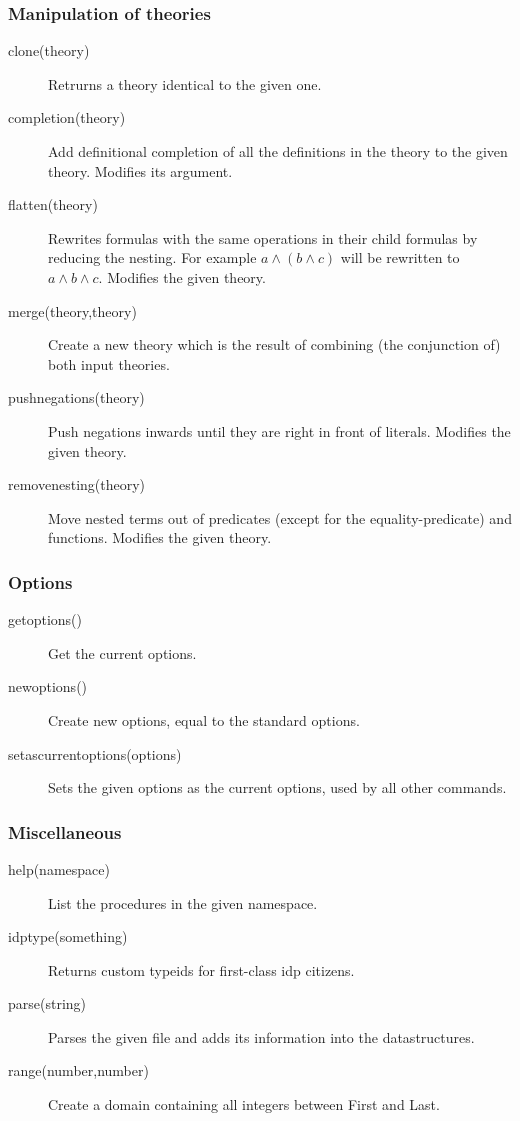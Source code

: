 \documentclass[a4]{article}
\begin{document}
\subsubsection{Manipulation of theories}
\begin{description}
	\item[clone(theory)]
		Retrurns a theory identical to the given one.
	\item[completion(theory)]
		Add definitional completion of all the definitions in the theory to the given theory. Modifies its argument.
	\item[flatten(theory)]
		Rewrites formulas with the same operations in their child formulas by reducing the nesting. For example $a \wedge (b\wedge c)$ will be rewritten to $a\wedge b \wedge c$.
		Modifies the given theory. 
	\item[merge(theory,theory)]
 		Create a new theory which is the result of combining (the conjunction of) both input theories.
	\item[pushnegations(theory)]
 		Push negations inwards until they are right in front of literals.
 		Modifies the given theory.
	\item[removenesting(theory)]
 		Move nested terms out of predicates (except for the equality-predicate) and functions.
 		Modifies the given theory.
\end{description}

\subsubsection{Options}
\begin{description}
	\item[getoptions()]
 		Get the current options.
	\item[newoptions()]
 		Create new options, equal to the standard options.
	\item[setascurrentoptions(options)]
 		Sets the given options as the current options, used by all other commands.
\end{description}

\subsubsection{Miscellaneous}
\begin{description}
	\item[help(namespace)]
 		List the procedures in the given namespace.
	\item[idptype(something)]
 		Returns custom typeids for first-class idp citizens.
	\item[parse(string)]
 		Parses the given file and adds its information into the datastructures.
	\item[range(number,number)]
 		Create a domain containing all integers between First and Last.
\end{description}
\end{document}
